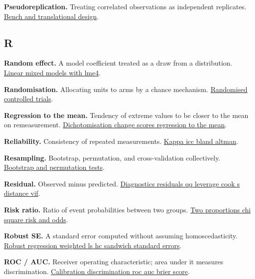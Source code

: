 \documentclass[
]{article}
\begin{document}
\textbf{Pseudoreplication.} Treating correlated observations as
independent replicates.
\href{../chapters/16-design/labs/lab-bench-and-translational-design.Rmd}{Bench
and translational design}.

\subsection{R}\label{r}

\textbf{Random effect.} A model coefficient treated as a draw from a
distribution.
\href{../chapters/16-design/labs/lab-linear-mixed-models-with-lme4.Rmd}{Linear
mixed models with lme4}.

\textbf{Randomisation.} Allocating units to arms by a chance mechanism.
\href{../chapters/16-design/labs/lab-randomised-controlled-trials.Rmd}{Randomised
controlled trials}.

\textbf{Regression to the mean.} Tendency of extreme values to be closer
to the mean on remeasurement.
\href{../chapters/07-regression/labs/lab-dichotomisation-change-scores-regression-to-the-mean.Rmd}{Dichotomisation
change scores regression to the mean}.

\textbf{Reliability.} Consistency of repeated measurements.
\href{../chapters/14-clinical/labs/lab-kappa-icc-bland-altman.Rmd}{Kappa
icc bland altman}.

\textbf{Resampling.} Bootstrap, permutation, and cross-validation
collectively.
\href{../chapters/04-inferential/labs/lab-bootstrap-and-permutation-tests.Rmd}{Bootstrap
and permutation tests}.

\textbf{Residual.} Observed minus predicted.
\href{../chapters/07-regression/labs/lab-diagnostics-residuals-qq-leverage-cook-s-distance-vif.Rmd}{Diagnostics
residuals qq leverage cook s distance vif}.

\textbf{Risk ratio.} Ratio of event probabilities between two groups.
\href{../chapters/04-inferential/labs/lab-two-proportions-chi-square-risk-and-odds.Rmd}{Two
proportions chi square risk and odds}.

\textbf{Robust SE.} A standard error computed without assuming
homoscedasticity.
\href{../chapters/07-regression/labs/lab-robust-regression-weighted-ls-hc-sandwich-standard-errors.Rmd}{Robust
regression weighted ls hc sandwich standard errors}.

\textbf{ROC / AUC.} Receiver operating characteristic; area under it
measures discrimination.
\href{../chapters/07-regression/labs/lab-calibration-discrimination-roc-auc-brier-score.Rmd}{Calibration
discrimination roc auc brier score}.
\end{document}
